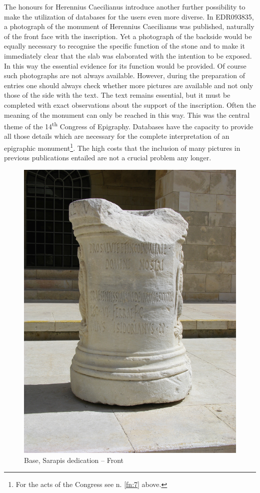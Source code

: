 \documentclass[amsthm,ebook]{saparticle}
\begin{document}
The honours for Herennius Caecilianus introduce another further possibility to 
make the utilization of databases for the users even more diverse. In EDR093835, 
a photograph of the monument of Herennius Caecilianus was published, naturally 
of the front face with the inscription. Yet a photograph of the backside would 
be equally necessary to recognise the specific function of the stone and to make 
it immediately clear that the slab was elaborated with the intention to be exposed. 
In this way the essential evidence for its function would be provided. Of course 
such photographs are not always available. However, during the preparation of entries 
one should always check whether more pictures are available and not only those 
of the side with the text. The text remains essential, but it must be completed 
with exact observations about the support of the inscription. Often the meaning 
of the monument can only be reached in this way. This was the central theme of 
the 14\textsuperscript{th} Congress of Epigraphy. Databases have the capacity to 
provide all those details which are necessary for the complete interpretation of 
an epigraphic monument\footnote{For the acts of the Congress see n. \ref{fn:7} above.}. The high costs that the inclusion of many pictures in previous 
publications entailed are not a crucial problem any longer. 

\begin{figure}[!bp]
\centering
 \includegraphics[scale=0.06]{images/fig11}
\caption{Base, Sarapis dedication -- Front}
\label{fig:11}
\end{figure}
\end{document}
